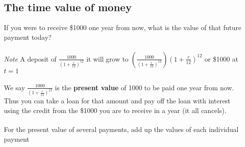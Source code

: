 \documentclass[12pt,letterpaper, twocolumn]{article}
\begin{document}
\subsection{The time value of money}
If you were to receive \$1000 one year from now, what is the value of that future payment today? 
\\\\
\textit{Note} A deposit of $\frac{1000}{(1+\frac{r}{12})^{12}}$ it will grow to $(\frac{1000}{(1+\frac{r}{12})^{12}})(1+\frac{r}{12})^{12}$ or \$1000 at $t=1$
\\\\
We say $\frac{1000}{(1+\frac{r}{12})^{12}}$ is the \textbf{present value} of 1000 to be paid one year from now. Thus you can take a loan for that amount and pay off the loan with interest using the credit from the \$1000 you are to receive in a year (it all cancels). 
\\\\
For the present value of several payments,  add up the values of each individual payment
\end{document}
